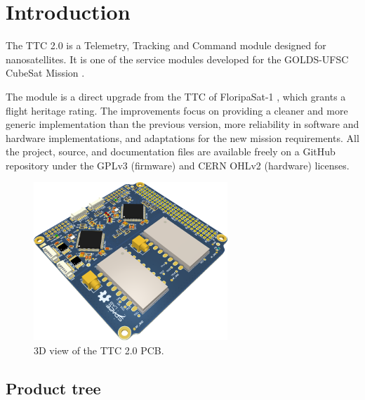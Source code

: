 %
%
%
%
%

%
%
%
%
%


\chapter{Introduction} \label{ch:introduction}

The TTC 2.0 is a Telemetry, Tracking and Command module designed for nanosatellites. It is one of the service modules developed for the GOLDS-UFSC CubeSat Mission \cite{floripasat2}.

The module is a direct upgrade from the TTC of FloripaSat-1 \cite{ttc-fsat}, which grants a flight heritage rating. The improvements focus on providing a cleaner and more generic implementation than the previous version, more reliability in software and hardware implementations, and adaptations for the new mission requirements. All the project, source, and documentation files are available freely on a GitHub repository \cite{ttc2-repo} under the GPLv3 (firmware) and CERN OHLv2 (hardware) licenses.

\begin{figure}[!h]
	\begin{center}
		\includegraphics[width=0.65\textwidth]{figures/ttc2_pcb_3d.png}
		\caption{3D view of the TTC 2.0 PCB.}
		\label{fig:pcb-3d}
	\end{center}
\end{figure}

\section{Product tree}

